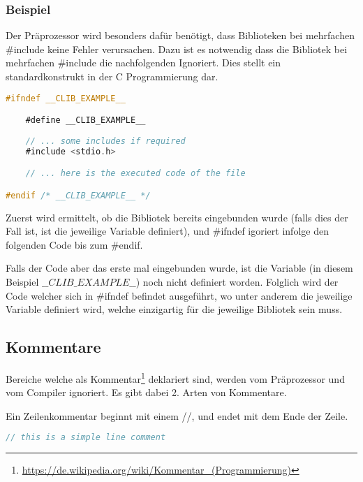 \subsubsection{Beispiel}

Der Pr\"aprozessor wird besonders daf\"ur ben\"otigt, dass Biblioteken bei mehrfachen \#include keine Fehler verursachen. Dazu ist es notwendig dass die Bibliotek bei mehrfachen \#include die nachfolgenden Ignoriert. Dies stellt ein standardkonstrukt in der C Programmierung dar.

\begin{lstlisting}[language=C]
#ifndef __CLIB_EXAMPLE__

	#define __CLIB_EXAMPLE__
	
	// ... some includes if required
	#include <stdio.h>

	// ... here is the executed code of the file

#endif /* __CLIB_EXAMPLE__ */
\end{lstlisting}

Zuerst wird ermittelt, ob die Bibliotek bereits eingebunden wurde (falls dies der Fall ist, ist die jeweilige Variable definiert), und \#ifndef igoriert infolge den folgenden Code bis zum \#endif.

Falls der Code aber das erste mal eingebunden wurde, ist die Variable (in diesem Beispiel $\_\_CLIB\_EXAMPLE\_\_$) noch nicht definiert worden. Folglich wird der Code welcher sich in \#ifndef befindet ausgef\"uhrt, wo unter anderem die jeweilige Variable definiert wird, welche einzigartig f\"ur die jeweilige Bibliotek sein muss.

\subsection{Kommentare}

Bereiche welche als Kommentar\footnote{\url{https://de.wikipedia.org/wiki/Kommentar_(Programmierung)}} deklariert sind, werden vom Pr\"aprozessor und vom Compiler ignoriert. Es gibt dabei 2. Arten von Kommentare.


Ein Zeilenkommentar beginnt mit einem //, und endet mit dem Ende der Zeile.

\begin{lstlisting}[language=C]
// this is a simple line comment
\end{lstlisting}


